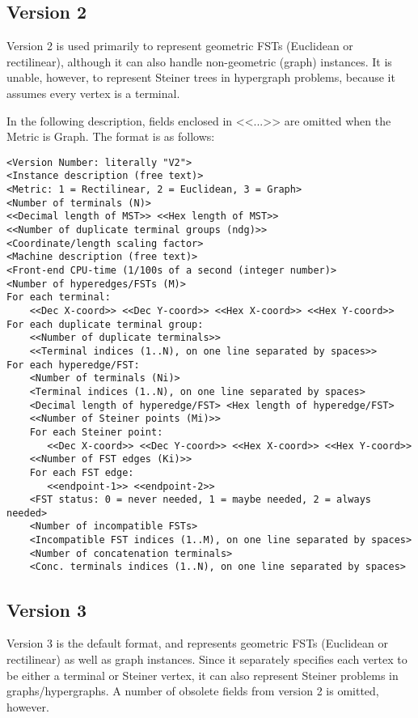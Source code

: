 \documentclass[12pt,twoside,letterpaper]{article}
\def\code#1{{\ttfamily #1}}
\begin{document}
\newpage
\subsection*{Version 2}

Version 2 is used primarily to represent geometric FSTs (Euclidean or
rectilinear), although it can also handle non-geometric (graph)
instances.  It is unable, however, to represent Steiner trees in
hypergraph problems, because it assumes every vertex is a terminal.

In the following description, fields enclosed in \code{<<...>>} are
omitted when the Metric is Graph.  The format is as follows:

{\footnotesize
\begin{verbatim}
<Version Number: literally "V2">
<Instance description (free text)>
<Metric: 1 = Rectilinear, 2 = Euclidean, 3 = Graph>
<Number of terminals (N)>
<<Decimal length of MST>> <<Hex length of MST>>
<<Number of duplicate terminal groups (ndg)>>
<Coordinate/length scaling factor>
<Machine description (free text)>
<Front-end CPU-time (1/100s of a second (integer number)>
<Number of hyperedges/FSTs (M)>
For each terminal:
    <<Dec X-coord>> <<Dec Y-coord>> <<Hex X-coord>> <<Hex Y-coord>>
For each duplicate terminal group:
    <<Number of duplicate terminals>>
    <<Terminal indices (1..N), on one line separated by spaces>>
For each hyperedge/FST:
    <Number of terminals (Ni)>
    <Terminal indices (1..N), on one line separated by spaces>
    <Decimal length of hyperedge/FST> <Hex length of hyperedge/FST>
    <<Number of Steiner points (Mi)>>
    For each Steiner point:
       <<Dec X-coord>> <<Dec Y-coord>> <<Hex X-coord>> <<Hex Y-coord>>
    <<Number of FST edges (Ki)>>
    For each FST edge:
       <<endpoint-1>> <<endpoint-2>>
    <FST status: 0 = never needed, 1 = maybe needed, 2 = always needed>
    <Number of incompatible FSTs>
    <Incompatible FST indices (1..M), on one line separated by spaces>
    <Number of concatenation terminals>
    <Conc. terminals indices (1..N), on one line separated by spaces>
\end{verbatim}
}

\newpage
\subsection*{Version 3}

Version 3 is the default format, and represents geometric FSTs
(Euclidean or rectilinear) as well as graph instances.  Since it
separately specifies each vertex to be either a terminal or Steiner
vertex, it can also represent Steiner problems in graphs/hypergraphs.
A number of obsolete fields from version 2 is omitted, however.
\end{document}
